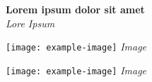 \documentclass[a4paper,12pt]{article}
\begin{document}
\begin{center}
    {\huge \textbf{ Lorem ipsum dolor sit amet}}\\
    \vspace{0.5cm}
    {\large \textit{Lore Ipsum}}
\end{center}

\begin{multicols}{2}

\lipsum[1-2]
\begin{center}
    \texttt{[image: example-image]} %
    \textit{Image}
\end{center}

\columnbreak

\begin{center}
    \texttt{[image: example-image]} %
    \textit{Image}
\end{center}

\lipsum[3-4]

\end{multicols}

\begin{multicols}{2}

\lipsum[5-9]

\end{multicols}
\end{document}
